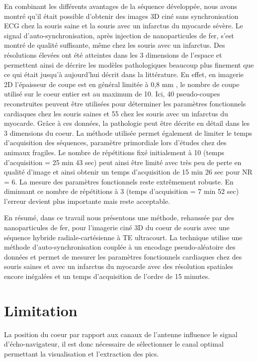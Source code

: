 En combinant les différents avantages de la séquence développée, nous avons montré qu’il était possible d’obtenir des images 3D ciné sans synchronisation ECG chez la souris saine et la souris avec un infarctus du myocarde sévère. Le signal d’auto-synchronisation, après injection de nanoparticules de fer, s’est montré de qualité suffisante, même chez les souris avec un infarctus. Des résolutions élevées ont été atteintes dans les 3 dimensions de l’espace et permettent ainsi de décrire les modèles pathologiques beaucoup plus finement que ce qui était jusqu’à aujourd’hui décrit dans la littérature. En effet, en imagerie 2D l’épaisseur de coupe est en général limitée à 0,8 mm \cite{Bovens:2011aa,Hoerr:2013gf}, le nombre de coupe utilisé sur le coeur entier est au maximum de 10. Ici, 40 pseudo-coupes reconstruites peuvent être utilisées pour déterminer les paramètres fonctionnels cardiaques chez les souris saines et 55 chez les souris avec un infarctus du myocarde. Grâce à ces données, la pathologie peut être décrite en détail dans les 3 dimensions du coeur. La méthode utilisée permet également de limiter le temps d’acquisition des séquences, paramètre primordiale lors d’études chez des animaux fragiles. Le nombre de répétitions fixé initialement à 10 (temps d’acquisition = 25 min 43 sec) peut ainsi être limité avec très peu de perte en qualité d’image et ainsi obtenir un temps d’acquisition de 15 min 26 sec pour NR = 6. La mesure des paramètres fonctionnels reste extrêmement robuste. En diminuant ce nombre de répétitions à 3 (temps d’acquisition = 7 min 52 sec) l’erreur devient plus importante mais reste acceptable. 

En résumé, dans ce travail nous présentons une méthode, rehaussée par des nanoparticules de fer, pour l’imagerie ciné 3D du coeur de souris avec une séquence hybride radiale-cartésienne à TE ultracourt. La technique utilise une méthode d’auto-synchronisation couplée à un encodage pseudo-aléatoire des données et permet de mesurer les paramètres fonctionnels cardiaques chez des souris saines et avec un infarctus du myocarde avec des résolution spatiales encore inégalées et un temps d’acquisition de l’ordre de 15 minutes. 


\section{Limitation}

La position du coeur par rapport aux canaux de l'antenne influence le signal d'écho-navigateur, il est donc nécessaire de sélectionner le canal optimal permettant la visualisation et l'extraction des pics. 

